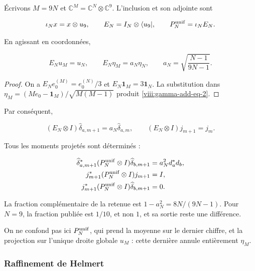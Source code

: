 Écrivons \(M=9N\) et \(\mathbb C^M=\mathbb C^N\otimes\mathbb C^9\). L'inclusion et son adjointe sont

\begin{equation}
\iota_Nx=x\otimes u_9,\qquad
E_N=I_N\otimes\langle u_9|,\qquad P_N^{\rm unif}=\iota_NE_N.
\label{viii:gamma-add-display-8}
\end{equation}

En agissant en coordonnées,

\begin{equation}
E_Nu_M=u_N,\qquad
E_N\eta_M=a_N\eta_N,\qquad
a_N=\sqrt{\frac{N-1}{9N-1}}.
\label{viii:gamma-add-eq-2}
\end{equation}

\begin{proof}
On a \(E_Ne_0^{(M)}=e_0^{(N)}/3\) et \(E_N\mathbf1_M=3\mathbf1_N\).
La substitution dans \(\eta_M=(Me_0-\mathbf1_M)/\sqrt{M(M-1)}\)
produit \eqref{viii:gamma-add-eq-2}.
\end{proof}

Par conséquent,

\begin{equation}
(E_N\otimes I)\widehat\delta_{a,m+1}=a_N\widehat\delta_{a,m},
\qquad
(E_N\otimes I)j_{m+1}=j_m.
\label{viii:gamma-add-eq-3}
\end{equation}

Tous les moments projetés sont déterminés :

\begin{equation}
\begin{aligned}
\widehat\delta_{a,m+1}^*(P_N^{\rm unif}\otimes I)\widehat\delta_{b,m+1}
 &=a_N^2d_a^*d_b,\\
j_{m+1}^*(P_N^{\rm unif}\otimes I)j_{m+1}&=I,\\
j_{m+1}^*(P_N^{\rm unif}\otimes I)\widehat\delta_{b,m+1}&=0.
\end{aligned}
\label{viii:gamma-add-eq-4}
\end{equation}

La fraction complémentaire de la retenue est \(1-a_N^2=8N/(9N-1)\). Pour \(N=9\), la fraction publiée est \(1/10\), et non \(1\), et sa sortie reste une différence.

On ne confond pas ici \(P_N^{\rm unif}\), qui prend la moyenne sur le dernier chiffre, et la projection sur l'unique droite globale \(u_M\) : cette dernière annule entièrement \(\eta_M\).

\subsubsection{Raffinement de Helmert}
\label{viii:gamma-add-sub-156}

